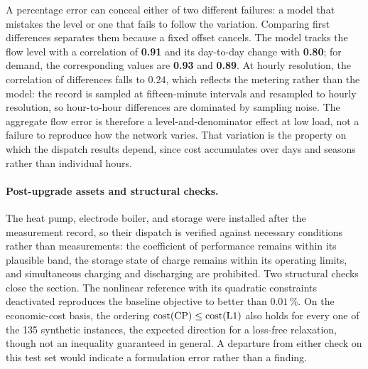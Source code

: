 A percentage error can conceal either of two different failures: a model that mistakes the
level or one that fails to follow the variation. Comparing first differences separates them
because a fixed offset cancels. The model tracks the flow level with a correlation of
\textbf{0.91} and its day-to-day change with \textbf{0.80}; for demand, the corresponding
values are \textbf{0.93} and \textbf{0.89}. At hourly resolution, the correlation of
differences falls to \(0.24\), which reflects the metering rather than the model: the record
is sampled at fifteen-minute intervals and resampled to hourly resolution, so hour-to-hour
differences are dominated by sampling noise. The aggregate flow error is therefore a
level-and-denominator effect at low load, not a failure to reproduce how the network varies.
That variation is the property on which the dispatch results depend, since cost accumulates
over days and seasons rather than individual hours.

\paragraph{Post-upgrade assets and structural checks.}
The heat pump, electrode boiler, and storage were installed after the measurement record, so
their dispatch is verified against necessary conditions rather than measurements: the
coefficient of performance remains within its plausible band, the storage state of charge
remains within its operating limits, and simultaneous charging and discharging are
prohibited. Two structural checks close the section. The nonlinear reference with its
quadratic constraints deactivated reproduces the baseline objective to better than
\(0.01\,\%\). On the economic-cost basis, the ordering
\(\mathrm{cost}(\mathrm{CP}) \leq \mathrm{cost}(\mathrm{L1})\) also holds for every one of the 135 synthetic
instances, the expected direction for a loss-free relaxation, though not an inequality
guaranteed in general. A departure from either check on this test set would indicate a
formulation error rather than a finding.